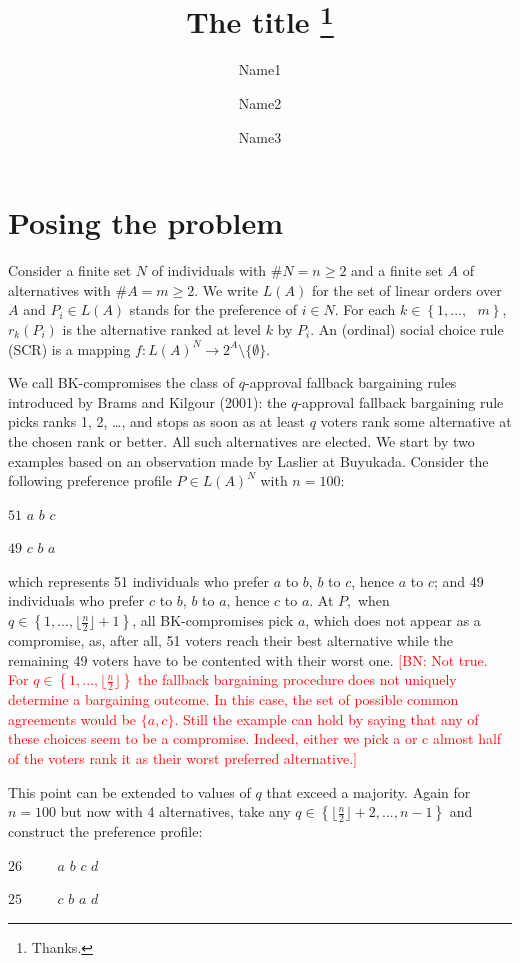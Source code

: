 \documentclass[version=3.21, pagesize, notitlepage, twoside=off, bibliography=totoc, DIV=calc, fontsize=12pt, a4paper]{scrartcl}
\title{The title \thanks{Thanks.}}
\author{Name1}
\author{Name2}
\affil{Université Paris-Dauphine, PSL Research University, CNRS, LAMSADE, 75016 PARIS, FRANCE\\
	\href{mailto:olivier.cailloux@dauphine.fr}{olivier.cailloux@dauphine.fr}
}
\author{Name3}
\affil{Affil2}
\newcommand{\commentBN}[1]{\textcolor{red}{\small$\big[$BN: #1$\big]$}}
\begin{document}
\section{Posing the problem}
Consider a finite set $N$ of individuals with $\#N=n\geq 2$ and a finite set $A$ of alternatives with $\#A=m\geq 2$. We write $L(A)$ for the set of linear orders over $A$ and $P_{i}\in L(A)$ stands for the preference of $i\in N$. For each $k\in \left\{ 1,...,\text{ }m\right\} $, $r_{k}(P_{i})$ is the alternative ranked at level $k$ by $P_{i}$. An (ordinal) social choice rule (SCR) is a mapping $f:L(A)^{N}\rightarrow 2^{A} \setminus \{\emptyset \}$.

We call BK-compromises the class of $q$-approval fallback bargaining rules introduced by Brams and Kilgour (2001): the $q$-approval fallback bargaining rule picks ranks 1, 2, …, and stops as soon as at least $q$ voters rank some alternative at the chosen rank or better. All such alternatives are elected.
We start by two examples based on an observation made by Laslier at Buyukada. Consider the following preference profile $P\in L(A)^{N}$ with $n=100$:

$51$ $a$ $b$ $c$

$49$ $c$ $b$ $a$

which represents 51 individuals who prefer $a$ to $b$, $b$ to $c$, hence $a$ to $c$; and 49 individuals who prefer $c$ to $b$, $b$ to $a$, hence $c$ to $a $. At $P,$ when $q\in \left\{ 1,..., \lfloor \frac{n}{2}\rfloor +1\right\} $, all BK-compromises pick $a$, which does not appear as a compromise, as, after all, 51 voters reach their best alternative while the remaining 49 voters have to be contented with their worst one.
\commentBN{Not true. For $q\in \left\{ 1,..., \lfloor \frac{n}{2}\rfloor \right\} $ the fallback bargaining procedure does not uniquely determine a bargaining outcome. In this case, the set of possible common agreements would be $\{a,c\}$. Still the example can hold by saying that any of these choices seem to be a compromise. Indeed, either we pick a or c almost half of the voters rank it as their worst preferred alternative.}

This point can be extended to values of $q$ that exceed a majority. Again for $n=100$ but now with 4 alternatives, take any $q\in \left\{ \lfloor \frac{n}{2}\rfloor +2,..., n-1\right\} $ and construct the preference profile:

$26$ $\ \ \ \ \ \ \ \ \ \ a$ $b$ $c$ $d$

$25$ $\ \ \ \ \ \ \ \ \ \ c$ $b$ $a$ $d$
\end{document}
